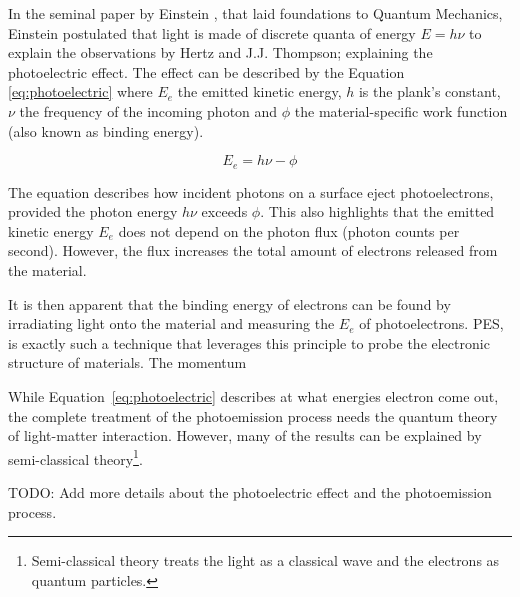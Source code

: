 In the seminal paper by Einstein \cite{einsteinUberErzeugungUnd1905}, that laid foundations to Quantum Mechanics, Einstein postulated that light is made of discrete quanta of energy $E = h\nu$ to explain the observations by Hertz and J.J. Thompson; explaining the photoelectric effect. The effect can be described by the Equation \ref{eq:photoelectric} where $E_e$ the emitted kinetic energy, $h$ is the plank's constant, $\nu$ the frequency of the incoming photon and  $\phi$ the material-specific work function (also known as binding energy). 

\begin{equation}\label{eq:photoelectric}
    E_e = h\nu - \phi
\end{equation}

The equation describes how incident photons on a surface eject photoelectrons, provided the photon energy $h\nu$ exceeds $\phi$. This also highlights that the emitted kinetic energy $E_e$ does not depend on the photon flux (photon counts per second). However, the flux increases the total amount of electrons released from the material.

It is then apparent that the binding energy of electrons can be found by irradiating light onto the material and measuring the $E_e$ of photoelectrons. \gls{PES}, is exactly such a technique that leverages this principle to probe the electronic structure of materials. The momentum 

While Equation~\ref{eq:photoelectric} describes at what energies electron come out, the complete treatment of the photoemission process needs the quantum theory of light-matter interaction. However, many of the results can be explained by semi-classical theory\footnote{Semi-classical theory treats the light as a classical wave and the electrons as quantum particles.}.


TODO: Add more details about the photoelectric effect and the photoemission process.






